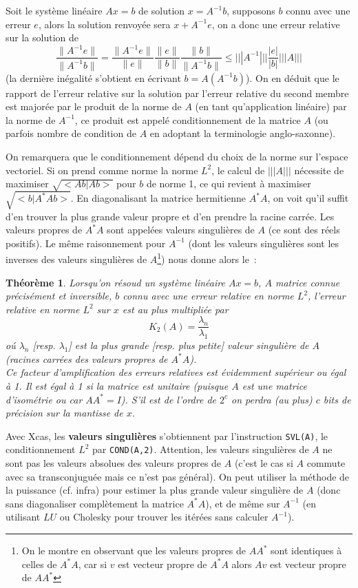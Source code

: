 \documentclass[a4paper,11pt]{article}
\newtheorem{thm}{Théorème}
\begin{document}
\begin{giacjshere}
Soit le syst\`eme lin\'eaire $Ax=b$ de solution $x=A^{-1}b$, 
supposons $b$ connu avec une erreur $e$, alors la solution renvoy\'ee
sera $x+A^{-1}e$, on a donc une erreur relative sur la solution de 
\[ \frac{\|A^{-1}e\|}{\|A^{-1}b\|} = \frac{\|A^{-1}e\|}{\|e\|} 
\frac{\|e\|}{\|b\|}
\frac{\|b\|}{\|A^{-1}b\|}  \leq |||A^{-1}|||  \frac{|e|}{|b|} |||A|||  \]
(la derni\`ere in\'egalit\'e s'obtient en \'ecrivant $b=A(A^{-1}b)$).
On en d\'eduit que le rapport de l'erreur relative sur la solution par l'erreur
relative du second membre est major\'ee par
le produit de la norme de $A$ (en tant qu'application lin\'eaire)
par la norme de $A^{-1}$, ce produit est appel\'e conditionnement
de la matrice $A$ (ou parfois nombre de condition de $A$ en adoptant
la terminologie anglo-saxonne).

On remarquera que le conditionnement d\'epend du choix de la norme sur
l'espace vectoriel.
Si on prend comme norme la norme $L^2$, le calcul de $|||A|||$
n\'ecessite de maximiser $\sqrt{<Ab|Ab>}$ pour $b$ de norme 1, ce qui revient
\`a maximiser $\sqrt{<b|A^* A b>}$. En diagonalisant la matrice hermitienne
$A^* A$, on voit qu'il suffit d'en trouver la plus grande valeur
propre et d'en prendre la racine carr\'ee. Les valeurs propres de
$A^*A$ sont appel\'ees valeurs singuli\`eres de $A$ (ce sont des
r\'eels positifs). Le m\^eme raisonnement pour $A^{-1}$ (dont les
valeurs singuli\`eres sont les inverses des valeurs singuli\`eres 
de $A$\footnote{On le montre en observant que les valeurs propres de 
$AA^*$ sont identiques \`a celles de $A^*A$, car si $v$ est
vecteur propre de $A^*A$ alors $Av$ est vecteur
propre de $AA^*$}) nous donne alors le~:
\begin{thm}
Lorsqu'on r\'esoud un syst\`eme lin\'eaire $Ax=b$, $A$ matrice connue
pr\'ecis\'ement et inversible, $b$ connu avec une erreur relative en
norme $L^2$, l'erreur relative en norme $L^2$ sur $x$ est au plus
multipli\'ee par
\[ K_2(A)= \frac{\lambda_n}{\lambda_1} \]
o\'u $\lambda_n$ [resp. $\lambda_1$] est la plus grande [resp. plus
petite] valeur singuli\`ere de $A$ (racines carr\'ees des
valeurs propres de $A^*A$).\\
Ce facteur d'amplification des erreurs relatives est \'evidemment
sup\'erieur ou \'egal \`a 1. Il est \'egal \`a 1 si la matrice est
unitaire (puisque $A$ est une matrice
d'isométrie ou car $AA^*=I$). 
S'il est de l'ordre de $2^c$ on perdra (au plus) $c$ bits de
pr\'ecision sur la mantisse de $x$.
\end{thm}
Avec Xcas, les {\bf valeurs singuli\`eres} 
s'obtiennent par l'instruction
\verb|SVL(A)|, le conditionnement $L^2$ par \verb|COND(A,2)|.
Attention, les valeurs singuli\`eres de $A$ ne sont pas les valeurs
absolues des valeurs propres de $A$ (c'est le cas si $A$ 
commute avec sa transconjugu\'ee mais ce n'est pas g\'en\'eral).
On peut utiliser la m\'ethode de la puissance (cf. infra) pour estimer la plus
grande valeur singuli\`ere de $A$ (donc sans diagonaliser compl\`etement
la matrice $A^*A$), et de m\^eme sur $A^{-1}$ (en utilisant $LU$
ou Cholesky pour trouver les it\'er\'ees sans calculer $A^{-1}$).


\end{giacjshere}
\end{document}
